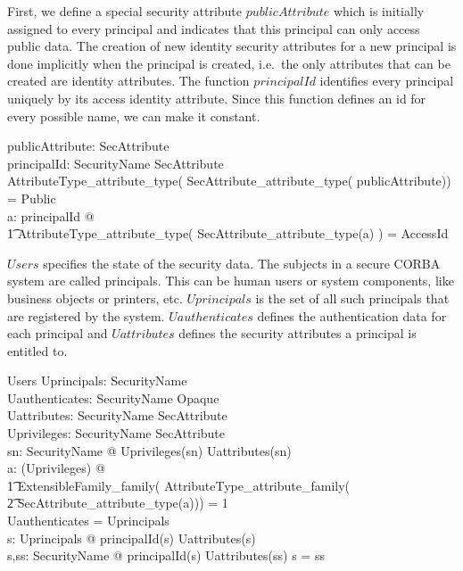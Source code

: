 First, we define a special security attribute $publicAttribute$ which is
initially assigned to every principal and indicates that this principal can only
access public data.  The creation of new identity security attributes for a new
principal is done implicitly when the principal is created, i.e.\ the only
attributes that can be created are identity attributes.  The function
$principalId$ identifies every principal uniquely by its access identity
attribute.  Since this function defines an id for every possible name, we can
make it constant.
  
\begin{axdef}
  publicAttribute: SecAttribute \\
  principalId: SecurityName \bij SecAttribute \\
  \where
  AttributeType\_attribute\_type( SecAttribute\_attribute\_type(
  publicAttribute)) = Public \\ 
  \forall a: \ran principalId @ \\
  \t1 AttributeType\_attribute\_type( SecAttribute\_attribute\_type(a) ) =
  AccessId \\
\end{axdef}

$Users$ specifies the state of the security data.  The subjects in a secure
CORBA system are called principals.  This can be human users or system
components, like business objects or printers, etc.  $Uprincipals$ is the set of
all such principals that are registered by the system.  $Uauthenticates$ defines
the authentication data for each principal and $Uattributes$ defines the
security attributes a principal is entitled to.
\begin{schema}{Users}
  Uprincipals: \power SecurityName \\
  Uauthenticates: SecurityName \fun Opaque \\
  Uattributes: SecurityName \fun \power SecAttribute \\
  Uprivileges: SecurityName \fun \power SecAttribute \\
  \where
  \forall sn: SecurityName @ Uprivileges(sn) \subseteq Uattributes(sn) \\
  \forall a: \bigcup (\ran Uprivileges) @ \\
  \t1 ExtensibleFamily\_family( AttributeType\_attribute\_family( \\
  \t2 SecAttribute\_attribute\_type(a))) = 1 \\
  \dom Uauthenticates = Uprincipals \\
  \forall s: Uprincipals @ principalId(s) \in Uattributes(s) \\
  \forall s,ss: SecurityName @ principalId(s) \in Uattributes(ss) \implies s =
  ss \\ 
\end{schema}


